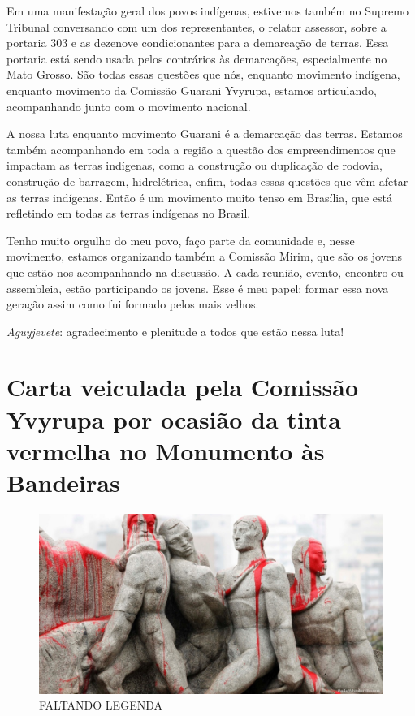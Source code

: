 Em uma manifestação geral dos povos indígenas, estivemos também no
Supremo Tribunal conversando com um dos representantes, o relator
assessor, sobre a portaria 303 e as dezenove condicionantes para a
demarcação de terras. Essa portaria está sendo usada pelos contrários
às demarcações, especialmente no Mato Grosso. São todas essas questões
que nós, enquanto movimento indígena, enquanto movimento da Comissão
Guarani Yvyrupa, estamos articulando, acompanhando junto com o
movimento nacional.

A nossa luta enquanto movimento Guarani é a demarcação das terras.
Estamos também acompanhando em toda a região a questão dos
empreendimentos que impactam as terras indígenas, como a construção ou
duplicação de rodovia, construção de barragem, hidrelétrica, enfim,
todas essas questões que vêm afetar as terras indígenas. Então é um
movimento muito tenso em Brasília, que está refletindo em todas as
terras indígenas no Brasil.

Tenho muito orgulho do meu povo, faço parte da comunidade e, nesse
movimento, estamos organizando também a Comissão Mirim, que são os
jovens que estão nos acompanhando na discussão. A cada reunião, evento,
encontro ou assembleia, estão participando os jovens. Esse é meu papel:
formar essa nova geração assim como fui formado pelos mais velhos. 

\emph{Aguyjevete}: agradecimento e plenitude a todos que estão nessa luta!

\chapter{Carta veiculada pela Comissão Yvyrupa por ocasião da tinta
vermelha no Monumento às Bandeiras}

\begin{figure}
  \centering
 \includegraphics[width=\textwidth]{./img/GUARANIS-img2.jpg}	
  \hfill
  \caption{FALTANDO LEGENDA}
\end{figure}

